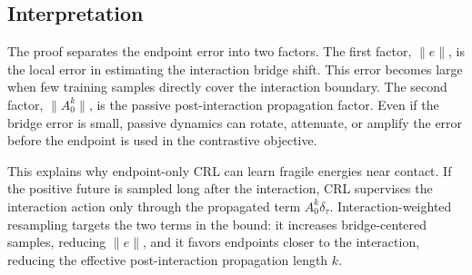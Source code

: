 \subsection{Interpretation}

The proof separates the endpoint error into two factors.
The first factor, $\|e\|$, is the local error in estimating the interaction bridge shift.
This error becomes large when few training samples directly cover the interaction boundary.
The second factor, $\|A_0^k\|$, is the passive post-interaction propagation factor.
Even if the bridge error is small, passive dynamics can rotate, attenuate, or amplify the error before
the endpoint is used in the contrastive objective.

This explains why endpoint-only CRL can learn fragile energies near contact.
If the positive future is sampled long after the interaction, CRL supervises the interaction action only
through the propagated term $A_0^k\delta_\tau$.
Interaction-weighted resampling targets the two terms in the bound: it increases bridge-centered
samples, reducing $\|e\|$, and it favors endpoints closer to the interaction, reducing the effective
post-interaction propagation length $k$.